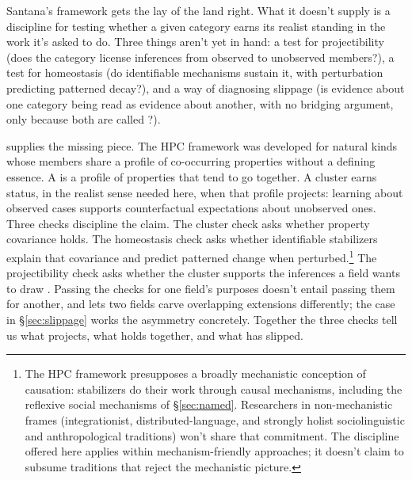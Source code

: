 \documentclass[12pt]{article}
\begin{document}
Santana's framework gets the lay of the land right. What it doesn't supply is a discipline for testing whether a given category earns its realist standing in the work it's asked to do. Three things aren't yet in hand: a test for projectibility (does the category license inferences from observed to unobserved members?), a test for homeostasis (do identifiable mechanisms sustain it, with perturbation predicting patterned decay?), and a way of diagnosing slippage (is evidence about one category being read as evidence about another, with no bridging argument, only because both are called ?).

\textcite{boyd1991, boyd1999} supplies the missing piece. The HPC framework was developed for natural kinds whose members share a profile of co-occurring properties without a defining essence. A  is a profile of properties that tend to go together. A cluster earns  status, in the realist sense needed here, when that profile projects: learning about observed cases supports counterfactual expectations about unobserved ones. Three checks discipline the claim. The cluster check asks whether property covariance holds. The homeostasis check asks whether identifiable stabilizers explain that covariance and predict patterned change when perturbed.\footnote{The HPC framework presupposes a broadly mechanistic conception of causation: stabilizers do their work through causal mechanisms, including the reflexive social mechanisms of §\ref{sec:named}. Researchers in non-mechanistic frames (integrationist, distributed-language, and strongly holist sociolinguistic and anthropological traditions) won't share that commitment. The discipline offered here applies within mechanism-friendly approaches; it doesn't claim to subsume traditions that reject the mechanistic picture.} The projectibility check asks whether the cluster supports the inferences a field wants to draw \citep[see also][]{khalidi2013}. Passing the checks for one field's purposes doesn't entail passing them for another, and  lets two fields carve overlapping extensions differently; the  case in §\ref{sec:slippage} works the asymmetry concretely. Together the three checks tell us what projects, what holds together, and what has slipped.
\end{document}

